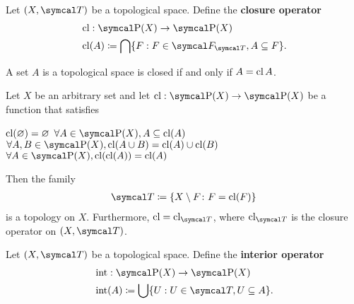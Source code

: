 \begin{definition}\label{def:closure_operator}\cite[33]{Engelking1989}
  Let \( (X, \Cal{T}) \) be a topological space. Define the \textbf{closure operator}
  \begin{align*}
    &\Cl: \Power(X) \to \Power(X) \\
    &\Cl(A) \coloneqq \bigcap \{ F : F \in \Cal{F}_{\Cal{T}}, A \subseteq F \}.
  \end{align*}
\end{definition}

\begin{proposition}\label{thm:set_closed_iff_matches_closure}
  A set \( A \) is a topological space is closed if and only if \( A = \operatorname{cl} A \).
\end{proposition}

\begin{proposition}\label{thm:closure_operator_axioms}\cite[14]{Engelking1989}
  Let \( X \) be an arbitrary set and let \( \Cl: \Power(X) \to \Power(X) \) be a function that satisfies
  \begin{description}
     \( \operatorname{cl}(\varnothing) = \varnothing \)
     \( \forall A \in \Power(X), A \subseteq \Cl(A) \)
     \( \forall A, B \in \Power(X), \Cl(A \cup B) = \Cl(A) \cup \Cl(B) \)
     \( \forall A \in \Power(X), \Cl(\Cl(A)) = \Cl(A) \)
  \end{description}

  Then the family
  \begin{align*}
    \Cal{T} \coloneqq \{ X \setminus F \colon F = \Cl(F) \}
  \end{align*}
  is a topology on \( X \). Furthermore, \( \Cl = \Cl_{\Cal{T}} \), where \( \Cl_{\Cal{T}} \) is the closure operator on \( (X, \Cal{T}) \).
\end{proposition}

\begin{definition}\label{def:interior_operator}\cite[15]{Engelking1989}
  Let \( (X, \Cal{T}) \) be a topological space. Define the \textbf{interior operator}
  \begin{align*}
    &\Int: \Power(X) \to \Power(X) \\
    &\Int(A) \coloneqq \bigcup \{ U : U \in \Cal{T}, U \subseteq A \}.
  \end{align*}
\end{definition}


